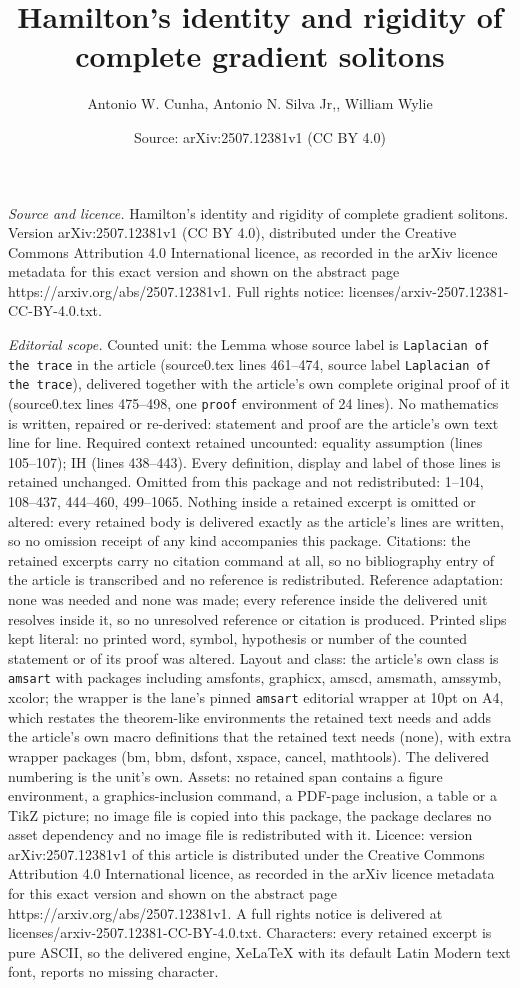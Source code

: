 \documentclass[10pt,a4paper]{amsart}
\title[Hamilton's identity and rigidity of complete gradient solito]{Hamilton's identity and rigidity of complete gradient solitons}
\author{Antonio W. Cunha, Antonio N. Silva Jr,, William Wylie}
\date{Source: arXiv:2507.12381v1 (CC BY 4.0)}
\begin{document}
\maketitle

\noindent\emph{Source and licence.} Hamilton's identity and rigidity of complete gradient solitons. Version arXiv:2507.12381v1 (CC BY 4.0), distributed under the Creative Commons Attribution 4.0 International licence, as recorded in the arXiv licence metadata for this exact version and shown on the abstract page https://arxiv.org/abs/2507.12381v1. Full rights notice: licenses/arxiv-2507.12381-CC-BY-4.0.txt.\par\smallskip

\noindent\textit{Editorial scope.} Counted unit: the Lemma whose source label is \texttt{Laplacian of the trace} in the article (source0.tex lines 461--474, source label \texttt{Laplacian of the trace}), delivered together with the article's own complete original proof of it (source0.tex lines 475--498, one \texttt{proof} environment of 24 lines). No mathematics is written, repaired or re-derived: statement and proof are the article's own text line for line. Required context retained uncounted: equality assumption (lines 105--107); IH (lines 438--443). Every definition, display and label of those lines is retained unchanged. Omitted from this package and not redistributed: 1--104, 108--437, 444--460, 499--1065. Nothing inside a retained excerpt is omitted or altered: every retained body is delivered exactly as the article's lines are written, so no omission receipt of any kind accompanies this package. Citations: the retained excerpts carry no citation command at all, so no bibliography entry of the article is transcribed and no reference is redistributed. Reference adaptation: none was needed and none was made; every reference inside the delivered unit resolves inside it, so no unresolved reference or citation is produced. Printed slips kept literal: no printed word, symbol, hypothesis or number of the counted statement or of its proof was altered. Layout and class: the article's own class is \texttt{amsart} with packages including amsfonts, graphicx, amscd, amsmath, amssymb, xcolor; the wrapper is the lane's pinned \texttt{amsart} editorial wrapper at 10pt on A4, which restates the theorem-like environments the retained text needs and adds the article's own macro definitions that the retained text needs (none), with extra wrapper packages (bm, bbm, dsfont, xspace, cancel, mathtools). The delivered numbering is the unit's own. Assets: no retained span contains a figure environment, a graphics-inclusion command, a PDF-page inclusion, a table or a TikZ picture; no image file is copied into this package, the package declares no asset dependency and no image file is redistributed with it. Licence: version arXiv:2507.12381v1 of this article is distributed under the Creative Commons Attribution 4.0 International licence, as recorded in the arXiv licence metadata for this exact version and shown on the abstract page https://arxiv.org/abs/2507.12381v1. A full rights notice is delivered at licenses/arxiv-2507.12381-CC-BY-4.0.txt. Characters: every retained excerpt is pure ASCII, so the delivered engine, XeLaTeX with its default Latin Modern text font, reports no missing character.
\end{document}
